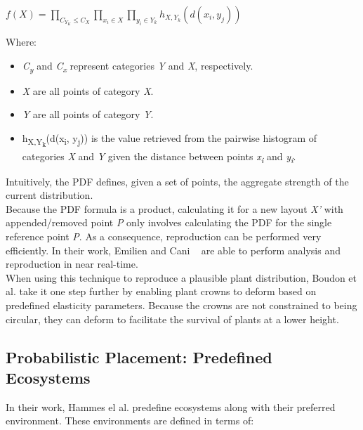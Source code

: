 \begin{center}
$ f(X) = \prod_{C_{Y_{K}} \leq C_{X}} 
		 \prod_{x_{i} \in X}
		 \prod_{y_{i} \in Y_{k}} 
		 h_{X,Y_{k}}(d(x_{i},y_{j}))$
\end{center} 

Where:
\begin{itemize}
\item \textit{C\textsubscript{y}} and \textit{C\textsubscript{x}} represent categories \textit{Y} and \textit{X}, respectively.
\item \textit{X} are all points of category \textit{X}.
\item \textit{Y} are all points of category \textit{Y}.
\item h\textsubscript{X,Y\textsubscript{k}}(d(x\textsubscript{i}, y\textsubscript{j})) is the value retrieved from the pairwise histogram of categories \textit{X} and \textit{Y} given the distance between points \textit{x\textsubscript{i}} and \textit{y\textsubscript{i}}.
\end{itemize}
Intuitively, the PDF defines, given a set of points, the aggregate strength of the current distribution.\\

Because the PDF formula is a product, calculating it for a new layout \textit{X'} with appended/removed point \textit{P} only involves calculating the PDF for the single reference point \textit{P}. As a consequence, reproduction can be performed very efficiently. In their work, Emilien and Cani ~\cite{Emilien} are able to perform analysis and reproduction in near real-time.\\

When using this technique to reproduce a plausible plant distribution, Boudon et al. \cite{Boudon2007} take it one step further by enabling plant crowns to deform based on predefined elasticity parameters. Because the crowns are not constrained to being circular, they can deform to facilitate the survival of plants at a lower height.

\subsection{Probabilistic Placement: Predefined Ecosystems}

In their work, Hammes el al. \cite{Hammes2001} predefine ecosystems along with their preferred environment. These environments are defined in terms of:

